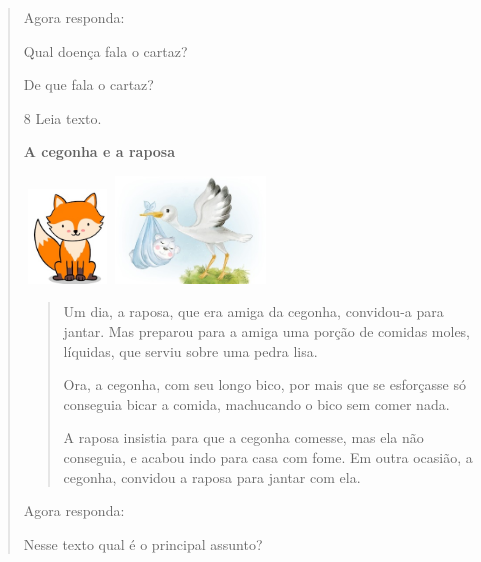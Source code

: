 \begin{verse}

Agora responda:

\begin{escolha}
\item Qual doença fala o cartaz?


\item De que fala o cartaz?

\end{escolha}

\num{8} Leia texto.

\textbf{A cegonha e a raposa}

\includegraphics[width=0.90625in,height=0.98597in]{media/image121.jpeg}
\includegraphics[width=1.57292in,height=1.12292in]{media/image122.jpeg}

\begin{quote}
Um dia, a raposa, que era amiga da cegonha, convidou-a para jantar. Mas
preparou para a amiga uma porção de comidas moles, líquidas, que serviu
sobre uma pedra lisa.

Ora, a cegonha, com seu longo bico, por mais que se esforçasse só
conseguia bicar a comida, machucando o bico sem comer nada.

A raposa insistia para que a cegonha comesse, mas ela não conseguia, e
acabou indo para casa com fome. Em outra ocasião, a cegonha, convidou a
raposa para jantar com ela.
\end{quote}


\begin{escolha}
Agora responda:

\item Nesse texto qual é o principal assunto?


\end{escolha}
\end{verse}
